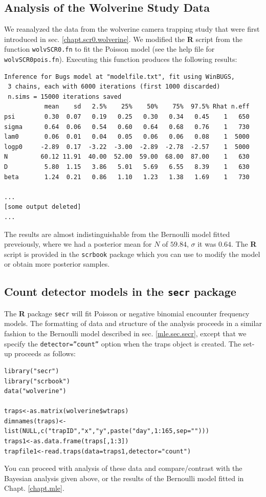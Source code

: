 \subsection{Analysis of the Wolverine Study Data}

We reanalyzed the data from
the  wolverine camera trapping study that were first introduced in 
sec. \ref{chapt.scr0.wolverine}.
We modified the {\bf R} script from the function \mbox{\tt wolvSCR0.fn} to fit the
Poisson model (see the help file for \mbox{\tt
  wolvSCR0pois.fn}). Executing this function produces the following
results:
{\small
\begin{verbatim}
Inference for Bugs model at "modelfile.txt", fit using WinBUGS,
 3 chains, each with 6000 iterations (first 1000 discarded)
 n.sims = 15000 iterations saved
           mean    sd   2.5%    25%    50%    75%  97.5% Rhat n.eff
psi        0.30  0.07   0.19   0.25   0.30   0.34   0.45    1   650
sigma      0.64  0.06   0.54   0.60   0.64   0.68   0.76    1   730
lam0       0.06  0.01   0.04   0.05   0.06   0.06   0.08    1  5000
logp0     -2.89  0.17  -3.22  -3.00  -2.89  -2.78  -2.57    1  5000
N         60.12 11.91  40.00  52.00  59.00  68.00  87.00    1   630
D          5.80  1.15   3.86   5.01   5.69   6.55   8.39    1   630
beta       1.24  0.21   0.86   1.10   1.23   1.38   1.69    1   730

...
[some output deleted]
...
\end{verbatim}
}
The results are almost indistinguishable from the Bernoulli model
fitted preveiously, where we had a posterior mean for $N$ of
 $59.84$,  $\sigma$ it was
$0.64$. The {\bf R} 
script is provided in the  \mbox{\tt scrbook} package which you can
use to modify the model or obtain more posterior samples.

\subsection{Count detector models in the  \mbox{\tt secr} package}

The {\bf R} package \mbox{\tt secr} will fit Poisson or negative
binomial encounter frequency models. The formatting of data and
structure of the analysis proceeds in a similar fashion to the
Bernoulli model described in sec. \ref{mle.sec.secr}, except that 
we specify the \mbox{\tt detector=''count''} option when the traps
object is created. The set-up proceeds as follows:
{\small
\begin{verbatim}
library("secr")
library("scrbook")
data("wolverine")

traps<-as.matrix(wolverine$wtraps)
dimnames(traps)<-list(NULL,c("trapID","x","y",paste("day",1:165,sep="")))
traps1<-as.data.frame(traps[,1:3])
trapfile1<-read.traps(data=traps1,detector="count")
\end{verbatim}
}
You can proceed with analysis of these data and compare/contrast with
the Bayesian analysis given above, or the results of the Bernoulli
model fitted in Chapt. \ref{chapt.mle}.



